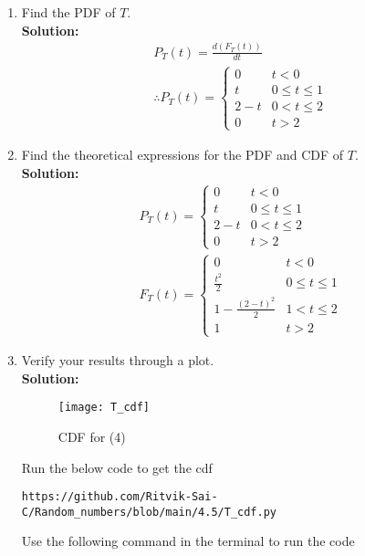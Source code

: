 \documentclass[journal,12pt,twocolumn]{IEEEtran}
\renewcommand\thesection{\arabic{section}}
\theoremstyle{remark}
\newcommand{\solution}{\noindent \textbf{Solution: }}
\numberwithin{equation}{section}
\begin{document}
\begin{enumerate}[label=\thesection.\arabic*
,ref=\thesection.\theenumi]
\begin{align}
&=1-\frac{(2-t)^{2}}{2}\\
&\therefore F_{T}(t)=P(U_1 +U_2<t)=
\begin{cases}
0 & t<0\\
\frac{t^2}{2} & 0\leq t \leq 1\\
1-\frac{(2-t)^{2}}{2} & 1< t \leq 2\\
1 & t>2
\end{cases}
\end{align}
\item Find the PDF of $T$.\\
\solution 
\begin{align}
P_{T}(t)=\frac{d(F_{T}(t))}{dt}\\
\therefore P_{T}(t)=
\begin{cases}
0 & t<0\\
t & 0\leq t \leq 1\\
2-t  & 0< t \leq 2\\
0 & t>2 
\end{cases}    
\end{align}
\item Find the theoretical expressions for the PDF and CDF of $T$.
\\
\solution
\begin{align}
P_{T}(t)=
\begin{cases}
0 & t<0\\
t & 0\leq t \leq 1\\
2-t  & 0< t \leq 2\\
0 & t>2 
\end{cases} 
\\   
F_{T}(t)=
\begin{cases}
0 & t<0\\
\frac{t^2}{2} & 0\leq t \leq 1\\
1-\frac{(2-t)^{2}}{2} & 1< t \leq 2\\
1 & t>2
\end{cases}
\end{align}
\item Verify your results through a plot. 
\\
\solution 
 \begin{figure}[h]
\texttt{[image: T\_cdf]}
\caption{CDF for (4)}
\label{fig:T_CDF}
\end{figure}
Run the below code to get the cdf
\begin{lstlisting}
https://github.com/Ritvik-Sai-C/Random_numbers/blob/main/4.5/T_cdf.py
\end{lstlisting}
Use the following command in the terminal to run the code

\end{enumerate}
\end{document}
